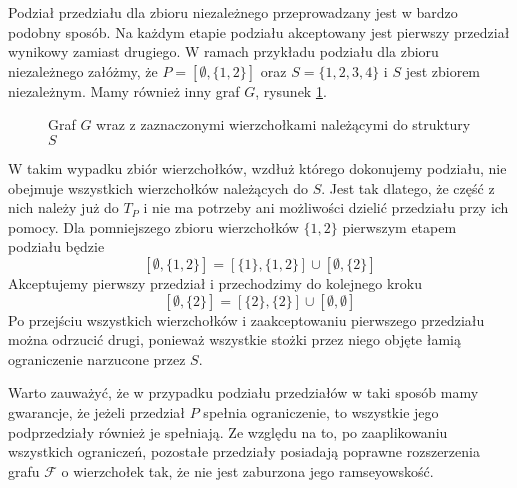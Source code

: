 Podział przedziału dla zbioru niezależnego przeprowadzany jest w bardzo podobny sposób. Na każdym etapie podziału akceptowany jest pierwszy przedział wynikowy zamiast drugiego. W ramach przykładu podziału dla zbioru niezależnego załóżmy, że 
$P = [\emptyset,\{1,2\}]$ oraz $S = \{1,2,3,4\}$ i $S$ jest zbiorem niezależnym. Mamy również inny graf $G$, rysunek \ref{roszerzenieN}.
\begin{figure}[H]
  \centering
    \caption{Graf $G$ wraz z zaznaczonymi wierzchołkami należącymi do struktury $S$}
    \label{roszerzenieN}
 \end{figure}
 

W takim wypadku zbiór wierzchołków, wzdłuż którego dokonujemy podziału, nie obejmuje wszystkich wierzchołków należących do $S$. Jest tak dlatego, że część z nich należy już do $T_P$ i nie ma potrzeby ani możliwości dzielić przedziału przy ich pomocy. Dla pomniejszego zbioru wierzchołków $\{1,2\}$ pierwszym etapem podziału będzie 
$$[{\emptyset},\{1,2\}]= [\{1\},\{1,2\}] \cup [{\emptyset},\{2\}]$$ Akceptujemy pierwszy przedział i przechodzimy do kolejnego kroku
$$ [{\emptyset},\{2\}]= [\{2\},\{2\}] \cup [{\emptyset},{\emptyset}]$$ Po przejściu wszystkich wierzchołków i zaakceptowaniu pierwszego przedziału można odrzucić drugi, ponieważ wszystkie stożki przez niego objęte łamią ograniczenie narzucone przez $S$.

Warto zauważyć, że w przypadku podziału przedziałów w taki sposób mamy gwarancje, że jeżeli przedział $P$ spełnia ograniczenie, to wszystkie jego podprzedziały również je spełniają. Ze względu na to, po zaaplikowaniu wszystkich ograniczeń, pozostałe przedziały posiadają poprawne rozszerzenia grafu $\mathcal{F}$ o wierzchołek tak, że nie jest zaburzona jego ramseyowskość. 
